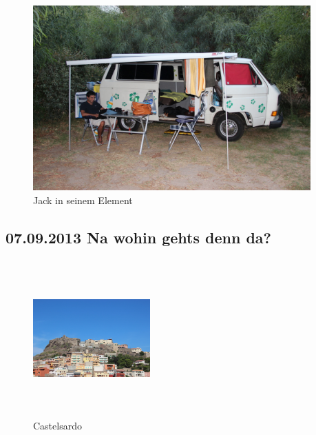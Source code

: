 \begin{figure}[hb]
    \centering
    \includegraphics[width=0.95\textwidth]{../Bilder/Sardinien/38.jpg}
    \caption{Jack in seinem Element}
    \label{img:Sardinien4}
\end{figure}

\newpage

\subsection{07.09.2013 Na wohin gehts denn da?} 

\begin{figure} 
  \begin{centering}
    \includegraphics[width=0.4\textwidth, height=6cm, keepaspectratio]{../Bilder/Sardinien/40.jpg}
    \caption{Castelsardo}
  \end{centering}
\end{figure} 

